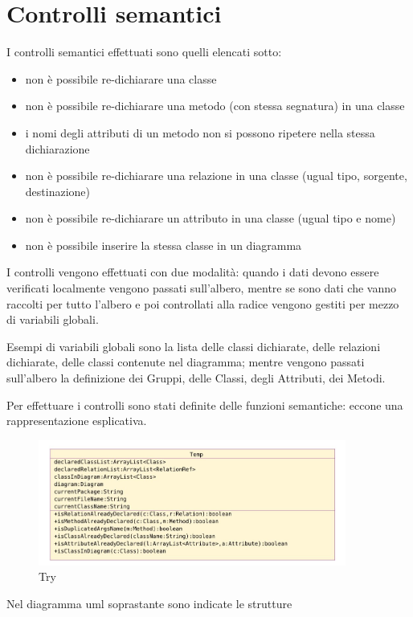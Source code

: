 \section{Controlli semantici}

I controlli semantici effettuati sono quelli elencati sotto:
\begin{itemize}
   \item non è possibile re-dichiarare una classe
   \item non è possibile re-dichiarare una metodo (con stessa segnatura) in una
   classe
   \item i nomi degli attributi di un metodo non si possono ripetere nella stessa dichiarazione
   \item non è possibile re-dichiarare una relazione in una classe (ugual tipo,
   sorgente, destinazione)
   \item non è possibile re-dichiarare un attributo in una classe (ugual tipo e
   nome)
   \item non è possibile inserire la stessa classe in un diagramma 
\end{itemize}

I controlli vengono effettuati con due modalità: quando i dati devono essere
verificati localmente vengono passati sull'albero, mentre se sono dati che vanno
raccolti per tutto l'albero e poi controllati alla radice vengono gestiti per
mezzo di variabili globali.

Esempi di variabili globali sono la lista delle classi dichiarate, delle
relazioni dichiarate, delle classi contenute nel diagramma; mentre vengono passati
sull'albero la
definizione dei Gruppi, delle Classi, degli Attributi, dei Metodi.

Per effettuare i controlli sono stati definite delle funzioni semantiche: eccone
una rappresentazione esplicativa.

\begin{figure}[htp]
\begin{center}
  \includegraphics[width=0.9\textwidth]{img/uml_compilatore.png}
  \caption[labelInTOC]{Try}
\end{center}
\end{figure}

Nel diagramma uml soprastante sono indicate le strutture
